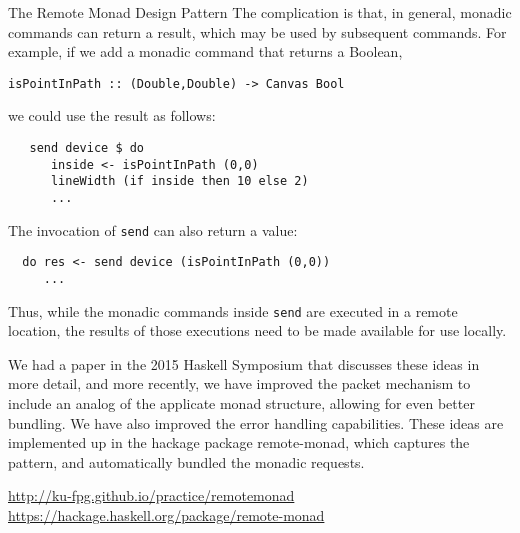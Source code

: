 \begin{hcarentry}[new]{The Remote Monad Design Pattern}
The complication is that, in general, monadic commands can return a
result, which may be used by subsequent commands.  For example, if we
add a monadic command that returns a Boolean,

{\footnotesize
\begin{verbatim}
isPointInPath :: (Double,Double) -> Canvas Bool
\end{verbatim}
}

we could use the result as follows:

{\footnotesize
\begin{verbatim}
   send device $ do
      inside <- isPointInPath (0,0)
      lineWidth (if inside then 10 else 2)
      ...
\end{verbatim}
}

The invocation of \verb`send` can also return a value:

{\footnotesize
\begin{verbatim}
  do res <- send device (isPointInPath (0,0))
     ...
\end{verbatim}
}

Thus, while the monadic commands inside \verb`send` are executed in a
remote location, the results of those executions need to be made
available for use locally. 

We had a paper in the 2015 Haskell Symposium that discusses these ideas in more detail,
and more recently, we have improved the packet mechanism to include an analog of
the applicate monad structure, allowing for even better bundling. We have also improved
the error handling capabilities. 
These ideas are implemented up in the hackage package remote-monad, which captures
the pattern, and automatically bundled the monadic requests.

\FurtherReading
  \url{http://ku-fpg.github.io/practice/remotemonad}
  \url{https://hackage.haskell.org/package/remote-monad}
\end{hcarentry}
